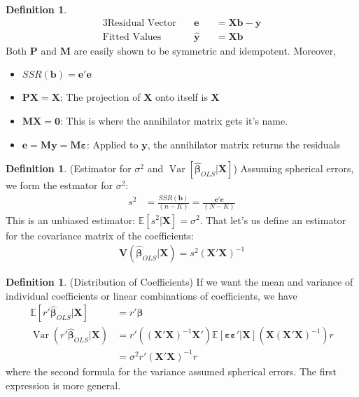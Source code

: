 \documentclass[12pt]{article}
\theoremstyle{plain}
\theoremstyle{definition}
\newtheorem{defn}[thm]{Definition}
\theoremstyle{remark}
\newcommand{\bsP}{\boldsymbol{P}}
\newcommand{\bsM}{\boldsymbol{M}}
\newcommand{\bsb}{\boldsymbol{b}}
\newcommand{\bse}{\boldsymbol{e}}
\newcommand{\bshaty}{\boldsymbol{\hat{y}}}
\newcommand{\bsX}{\boldsymbol{X}}
\newcommand{\bsy}{\boldsymbol{y}}
\newcommand{\bsV}{\boldsymbol{V}}
\newcommand{\bso}{\boldsymbol{0}}
\newcommand{\bsvarepsilon}{\boldsymbol{\varepsilon}}
\newcommand{\bsbeta}{\boldsymbol{\beta}}
\newcommand{\bshatbeta}{\boldsymbol{\hat{\beta}}}
\newcommand{\E}{\mathbb{E}}
\newcommand{\Var}{\operatorname{Var}}
\begin{document}
\begin{defn}
\begin{alignat*}{3}
  \text{Residual Vector}&\quad
  \bse &&= \bsX\bsb - \bsy \\
  \text{Fitted Values}&\quad
  \bshaty &&= \bsX\bsb
\end{alignat*}
Both $\bsP$ and $\bsM$ are easily shown to be symmetric and idempotent.
Moreover,
\begin{itemize}
  \item $SSR(\bsb) = \bse'\bse$
  \item $\bsP\bsX=\bsX$: The projection of $\bsX$ onto itself is $\bsX$
  \item $\bsM\bsX = \bso$: This is where the annihilator matrix gets
    it's name.
  \item $\bse = \bsM\bsy = \bsM \bsvarepsilon$: Applied to $\bsy$, the
    annihilator matrix returns the residuals
\end{itemize}
\end{defn}

\begin{defn}(Estimator for $\sigma^2$ and $\Var[\hat{\bsbeta}_{OLS}|\bsX]$)
Assuming spherical errors, we form the estmator for $\sigma^2$:
\begin{align*}
  s^2 &= \frac{SSR(\bsb)}{(n-K)} = \frac{\bse'\bse}{(N-K)}
\end{align*}
This is an unbiased estimator: $\E[s^2|\bsX]=\sigma^2$. That let's us
define an estimator for the covariance matrix of the coefficients:
\begin{align*}
  \hat{\bsV}(\hat{\bsbeta}_{OLS}|\bsX) = s^2(\bsX'\bsX)^{-1}
\end{align*}
\end{defn}

\begin{defn}(Distribution of Coefficients)
If we want the mean and variance of individual coefficients or linear
combinations of coefficients, we have
\begin{align*}
  \E[r'\bshatbeta_{OLS}|\bsX]
  &= r'\bsbeta \\
  \Var(r'\bshatbeta_{OLS}|\bsX)
  &=
  r'\left((\bsX'\bsX)^{-1}\bsX'\right)
  \E[\bsvarepsilon\bsvarepsilon' |\bsX]
  \left(\bsX(\bsX'\bsX)^{-1}\right) r \\
  &=
  \sigma^2r'(\bsX'\bsX)^{-1} r
\end{align*}
where the second formula for the variance assumed spherical errors. The
first expression is more general.
\end{defn}
\end{document}
